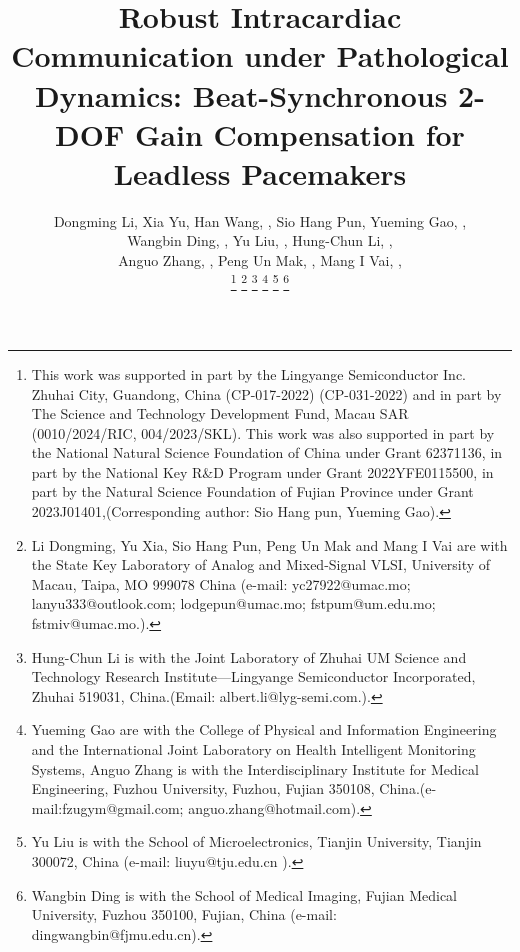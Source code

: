 \documentclass[journal]{IEEEtran}
\begin{document}
\title{Robust Intracardiac Communication under Pathological Dynamics: Beat-Synchronous 2-DOF Gain Compensation for Leadless Pacemakers}

\author{
Dongming Li, Xia Yu, Han Wang, ,
 Sio Hang Pun, Yueming Gao, ,

Wangbin Ding, ,
Yu Liu, ,
Hung-Chun Li, ,

Anguo Zhang, ,
Peng Un Mak, ,
Mang I Vai, ,

\thanks{This work was supported in part by the Lingyange Semiconductor Inc. Zhuhai City, Guandong,
China (CP-017-2022) (CP-031-2022) and in part by The Science and Technology Development Fund, Macau SAR (0010/2024/RIC, 004/2023/SKL). This work was also supported in part by the National Natural Science
Foundation of China under Grant 62371136, in part by the National Key R\&D Program under Grant 2022YFE0115500, in part by the Natural Science Foundation of Fujian Province under Grant 2023J01401,(Corresponding author: Sio Hang pun, Yueming Gao).}
\thanks{Li Dongming, Yu Xia, Sio Hang Pun, Peng Un Mak and Mang I Vai are with the State Key Laboratory of Analog and Mixed-Signal VLSI, University of Macau, Taipa, MO 999078 China (e-mail: yc27922@umac.mo; lanyu333@outlook.com; lodgepun@umac.mo; fstpum@um.edu.mo; fstmiv@umac.mo.).}
\thanks{Hung-Chun Li is with the Joint Laboratory of Zhuhai UM Science and Technology Research Institute—Lingyange Semiconductor Incorporated, Zhuhai 519031, China.(Email: albert.li@lyg-semi.com.).}
\thanks{Yueming Gao are with the College of Physical and Information Engineering and the International Joint Laboratory on Health Intelligent Monitoring Systems, Anguo Zhang is with the Interdisciplinary Institute for Medical Engineering, Fuzhou University, Fuzhou, Fujian 350108, China.(e-mail:fzugym@gmail.com; anguo.zhang@hotmail.com).}
\thanks{Yu Liu is with the School of Microelectronics, Tianjin University, Tianjin 300072, China (e-mail: liuyu@tju.edu.cn ).}
\thanks{Wangbin Ding is with the School of Medical Imaging, Fujian Medical University, Fuzhou  350100, Fujian, China (e-mail: dingwangbin@fjmu.edu.cn).}
}

\maketitle
\end{document}
